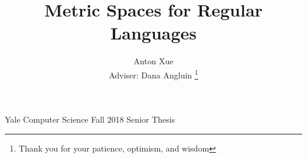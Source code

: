 \documentclass[12pt]{article}
\title{Metric Spaces for Regular Languages}
\author{Anton Xue \\
  Adviser: Dana Angluin
  \thanks{Thank you for your patience, optimism, and wisdom}
}
\date{}
\begin{document}
\maketitle

\begin{center}
  Yale Computer Science Fall 2018 Senior Thesis
\end{center}

\newpage

\tableofcontents

\newpage























\newpage

\printbibliography


\end{document}
